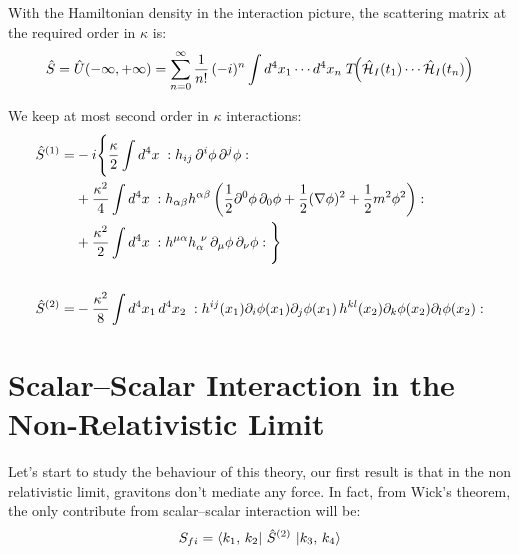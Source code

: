 \documentclass[12pt,a4paper]{article}
\begin{document}
With the Hamiltonian density in the interaction picture, the scattering matrix at the required order in $\kappa$ is:
\begin{equation}
    \hat{S} = \hat{U}(-\infty,+\infty) = \sum_{n=0}^{\infty} \frac{1}{n!}\,(-i)^n \int d^4x_1 \cdots d^4x_n\; T\!\Bigl(\hat{\mathcal{H}}_I(t_1)\cdots\hat{\mathcal{H}}_I(t_n)\Bigr)
\end{equation}

We keep at most second order in $\kappa$ interactions:
\begin{align}
\hat{S}^{(1)} = &-i \Bigg\{ 
 \frac{\kappa}{2} \int d^4x \; :h_{ij}\, \partial^i \phi \, \partial^j \phi: \notag\\
& + \frac{\kappa^2}{4} \int d^4x \; :h_{\alpha\beta} h^{\alpha\beta}
\left( \frac{1}{2}\partial^0\phi\,\partial_0\phi
+ \frac{1}{2}(\nabla \phi)^2
+ \frac{1}{2} m^2 \phi^2 \right): \notag\\
& + \frac{\kappa^2}{2} \int d^4x \; :h^{\mu\alpha} h_{\alpha}^{\ \nu}
\, \partial_\mu \phi \, \partial_\nu \phi:
\Bigg\} \\
\\
\hat{S}^{(2)} =
& -\frac{\kappa ^ 2}{8}\int d^4x_1\, d^4x_2 \; :
h^{ij}(x_1)\partial_i \phi(x_1)\partial_j \phi(x_1)\,
h^{kl}(x_2)\partial_k \phi(x_2)\partial_l \phi(x_2):
\end{align}

\section*{Scalar--Scalar Interaction in the Non-Relativistic Limit}
Let's start to study the behaviour of this theory, our first result is that in the non relativistic limit, gravitons don't mediate any force. In fact, from Wick's theorem, the only contribute from scalar--scalar interaction will be:
\begin{equation}
  S_{fi} = \Bra{k_1,\, k_2}\, \hat{S}^{(2)} \,\Ket{k_3,\, k_4}
\end{equation}
\end{document}
